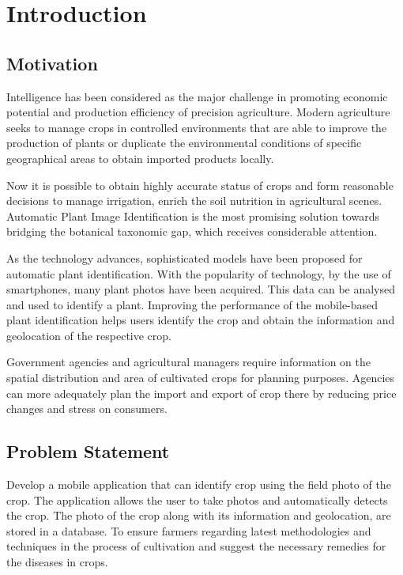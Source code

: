 \documentclass[../Report.tex]{subfiles}
\begin{document}
\chapter{Introduction}

\section{Motivation}

Intelligence has been considered as the major challenge in promoting economic potential and production efficiency of precision
agriculture. Modern agriculture seeks to manage crops in controlled environments that are able to improve the production of plants or
duplicate the environmental conditions of specific geographical areas to obtain imported products locally.\par
Now it is possible to obtain highly accurate status of crops and form reasonable decisions to manage irrigation, enrich the soil
nutrition in agricultural scenes. Automatic Plant Image Identification is the most promising solution towards bridging the botanical
taxonomic gap, which receives considerable attention.\par
As the technology advances, sophisticated models have been proposed for automatic plant identification. With the popularity of technology, 
by the use of smartphones, many plant photos have been acquired. This data can be analysed and used to identify a plant. Improving the 
performance of the mobile-based plant identification helps users identify the crop and obtain the information and geolocation of the 
respective crop.\par
Government agencies and agricultural managers require information on the spatial distribution and area of cultivated crops for planning 
purposes. Agencies can more adequately plan the import and export of crop there by reducing price changes and stress on consumers.

\section{Problem Statement}

Develop a mobile application that can identify crop using the field photo of the crop. The application allows the user to take photos 
and automatically detects the crop. The photo of the crop along with its information and geolocation, are stored in a database. To ensure 
farmers regarding latest methodologies and techniques in the process of cultivation and suggest the necessary remedies for the 
diseases in crops.\par
\end{document}
